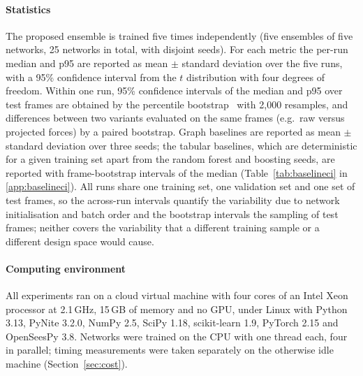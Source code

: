 \paragraph{Statistics} The proposed ensemble is trained five times independently (five ensembles of five networks, 25 networks in total, with disjoint seeds). For each metric the per-run median and p95 are reported as mean $\pm$ standard deviation over the five runs, with a 95\% confidence interval from the $t$ distribution with four degrees of freedom. Within one run, 95\% confidence intervals of the median and p95 over test frames are obtained by the percentile bootstrap~\cite{efron1993bootstrap} with 2{,}000 resamples, and differences between two variants evaluated on the same frames (e.g.\ raw versus projected forces) by a paired bootstrap. Graph baselines are reported as mean $\pm$ standard deviation over three seeds; the tabular baselines, which are deterministic for a given training set apart from the random forest and boosting seeds, are reported with frame-bootstrap intervals of the median (Table~\ref{tab:baselineci} in \ref{app:baselineci}). All runs share one training set, one validation set and one set of test frames, so the across-run intervals quantify the variability due to network initialisation and batch order and the bootstrap intervals the sampling of test frames; neither covers the variability that a different training sample or a different design space would cause.

\paragraph{Computing environment} All experiments ran on a cloud virtual machine with four cores of an Intel Xeon processor at 2.1\,GHz, 15\,GB of memory and no GPU, under Linux with Python 3.13, PyNite 3.2.0, NumPy 2.5, SciPy 1.18, scikit-learn 1.9, PyTorch 2.15 and OpenSeesPy 3.8. Networks were trained on the CPU with one thread each, four in parallel; timing measurements were taken separately on the otherwise idle machine (Section~\ref{sec:cost}).
